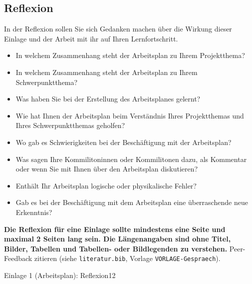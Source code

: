 \subsection{Reflexion}
\begin{hinweise}
In der Reflexion sollen Sie sich Gedanken machen über die Wirkung dieser Einlage und der Arbeit mit ihr auf
Ihren Lernfortschritt.
\begin{itemize}\itemsep0pt
\item In welchem Zusammenhang steht der Arbeitsplan zu Ihrem Projektthema?
\item In welchem Zusammenhang steht der Arbeitsplan zu Ihrem Schwerpunktthema?
\item Was haben Sie bei der Erstellung des Arbeitsplanes gelernt?
\item Wie hat Ihnen der Arbeitsplan beim Verständnis Ihres Projektthemas und Ihres Schwerpunktthemas geholfen?
\item Wo gab es Schwierigkeiten bei der Beschäftigung mit der Arbeitsplan?
\item Was sagen Ihre Kommilitoninnen oder Kommilitonen dazu, als Kommentar oder wenn Sie mit Ihnen über den Arbeitsplan diskutieren?
\item Enthält Ihr Arbeitsplan logische oder physikalische Fehler?
\item Gab es bei der Beschäftigung mit dem Arbeitsplan eine überraschende neue Erkenntnis?
\end{itemize}
\textbf{Die Reflexion für eine Einlage sollte mindestens eine Seite und maximal 2 Seiten lang sein. Die
Längenangaben sind ohne Titel, Bilder, Tabellen und Tabellen- oder Bildlegenden zu verstehen.}
Peer-Feedback zitieren (siehe \texttt{literatur.bib}, Vorlage \texttt{VORLAGE-Gespraech}).
\end{hinweise}
\begin{umfang}{Einlage 1 (Arbeitsplan): Reflexion}{1}{2}
\end{umfang}

